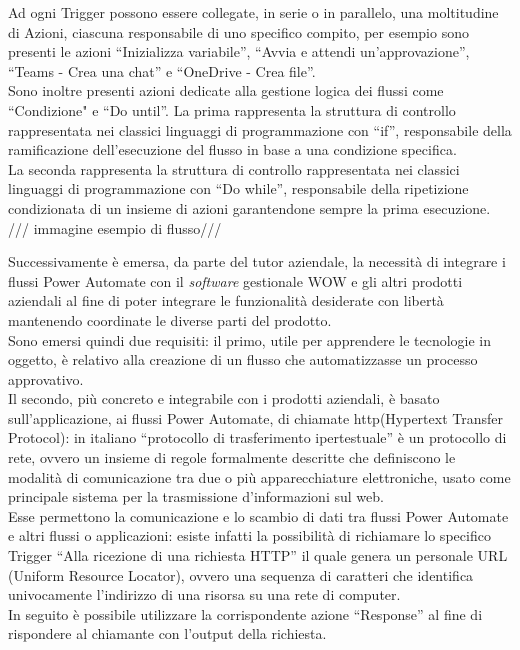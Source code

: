 \noindent Ad ogni Trigger possono essere collegate, in serie o in parallelo, una moltitudine di Azioni, ciascuna responsabile di uno specifico compito, per esempio sono presenti le azioni “Inizializza variabile”, “Avvia e attendi un'approvazione”, “Teams - Crea una chat” e “OneDrive - Crea file”.\\
Sono inoltre presenti azioni dedicate alla gestione logica dei flussi come “Condizione" e “Do until”. La prima rappresenta la struttura di controllo rappresentata nei classici linguaggi di programmazione con “if”, responsabile della ramificazione dell'esecuzione del flusso in base a una condizione specifica.\\
La seconda rappresenta la struttura di controllo rappresentata nei classici linguaggi di programmazione con “Do while”, responsabile della ripetizione condizionata di un insieme di azioni garantendone sempre la prima esecuzione.\\

/// immagine esempio di flusso/// 

\noindent Successivamente è emersa, da parte del tutor aziendale, la necessità di integrare i flussi Power Automate con il \emph{software} gestionale WOW e gli altri prodotti aziendali al fine di poter integrare le funzionalità desiderate con libertà mantenendo coordinate le diverse parti del prodotto.\\
Sono emersi quindi due requisiti: il primo, utile per apprendere le tecnologie in oggetto, è relativo alla creazione di un flusso che automatizzasse un processo approvativo.\\
Il secondo, più concreto e integrabile con i prodotti aziendali, è basato sull'applicazione, ai flussi Power Automate, di chiamate \gls{http}(Hypertext Transfer Protocol): in italiano “protocollo di trasferimento ipertestuale” è un protocollo di rete, ovvero un insieme di regole formalmente descritte che definiscono le modalità di comunicazione tra due o più apparecchiature elettroniche, usato come principale sistema per la trasmissione d'informazioni sul web.\\
Esse permettono la comunicazione e lo scambio di dati tra flussi Power Automate e altri flussi o applicazioni: esiste infatti la possibilità di richiamare lo specifico Trigger “Alla ricezione di una richiesta HTTP” il quale genera un personale URL (Uniform Resource Locator), ovvero una sequenza di caratteri che identifica univocamente l'indirizzo di una risorsa su una rete di computer.\\
In seguito è possibile utilizzare la corrispondente azione “Response” al fine di rispondere al chiamante con l'output della richiesta.\\


